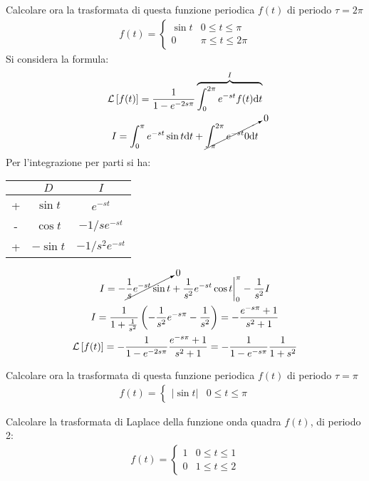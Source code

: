 \documentclass{article}
\newcommand{\df}{\mathrm{d}}
\numberwithin{equation}{subsection}
\begin{document}
Calcolare ora la trasformata di questa funzione periodica $f(t)$ di periodo $\tau=2\pi$
\begin{gather*}
    f(t)=\begin{cases}
        \sin t&0\leq t\leq\pi\\
        0&\pi\leq t\leq2\pi
    \end{cases}
\end{gather*}
Si considera la formula:
\begin{gather*}
    \mathcal{L}\left[f(t)\right]=\frac{1}{1-e^{-2s\pi}}\overbrace{\int_0^{2\pi}e^{-st}f(t)\df t}^I\\
    I=\int_0^\pi e^{-st}\sin t\df t+\cancelto{0}{\int_\pi^{2\pi}e^{-st}0\df t}
\end{gather*}
Per l'integrazione per parti si ha:
\begin{center}
    \begin{tabular}{|c||c|c|}
        \hline
        &$D$&$I$\\\hline
        +&$\sin t$&$e^{-st}$\\\hline
        -&$\cos t$&$-1/se^{-st}$\\\hline
        +&$-\sin t$&$-1/s^2e^{-st}$\\\hline
    \end{tabular}
\end{center}
\begin{gather*}
    I=-\cancelto{0}{\frac{1}{s}e^{-st}\sin t}+\frac{1}{s^2}e^{-st}\cos t\bigg|_0^{\pi}-\frac{1}{s^2}I\\
    I=\frac{1}{1+\frac{1}{s^2}}\left(-\frac{1}{s^2}e^{-s\pi}-\frac{1}{s^2}\right)=-\frac{e^{-s\pi}+1}{s^2+1}\\
    \mathcal{L}\left[f(t)\right]=-\frac{1}{1-e^{-2s\pi}}\frac{e^{-s\pi}+1}{s^2+1}=-\frac{1}{1-e^{-s\pi}}\frac{1}{1+s^2}
\end{gather*}



Calcolare ora la trasformata di questa funzione periodica $f(t)$ di periodo $\tau=\pi$
\begin{gather*}
    f(t)=\begin{cases}
        |\sin t|&0\leq t\leq\pi
    \end{cases}
\end{gather*}

Calcolare la trasformata di Laplace della funzione onda quadra $f(t)$, di periodo 2:
\begin{gather*}
    f(t)=\begin{cases}
        1 & 0\leq t\leq1\\
        0 & 1\leq t\leq2
    \end{cases}
\end{gather*}
\end{document}
